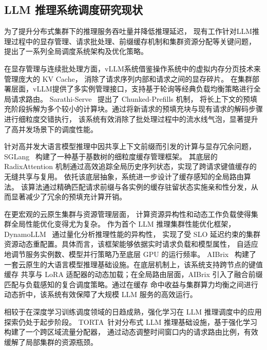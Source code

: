 \subsection{LLM 推理系统调度研究现状}\label{subsec:llm-routing}

为了提升分布式集群下的推理服务吞吐量并降低推理延迟，
现有工作针对LLM推理过程中的显存管理、请求批处理、前缀缓存机制和集群资源分配等关键问题，
提出了一系列全局调度系统架构及优化策略。

在显存管理与连续批处理方面，vLLM系统借鉴操作系统中的虚拟内存分页技术来管理庞大的 KV Cache，
消除了请求序列内部和请求之间的显存碎片。
在集群部署层面，vLLM提供了多实例管理接口，支持基于轮询等经典负载均衡策略进行全局请求路由。
Sarathi-Serve~\cite{agrawal2024taming} 提出了 Chunked-Prefills 机制，
将长上下文的预填充阶段拆解为多个较小的计算块。通过将新请求的预填充块与现有请求的解码步骤进行细粒度交错执行，
该系统有效消除了批处理过程中的流水线气泡，显著提升了高并发场景下的调度性能。

针对高并发大语言模型推理中因共享上下文前缀而引发的计算与显存冗余问题，
SGLang~\cite{zheng2024sglang} 构建了一种基于基数树的细粒度缓存管理框架。
其底层的 RadixAttention 机制通过高效追踪全局历史序列状态，实现了跨请求键值缓存的无缝共享与复用。
依托该底层抽象，系统进一步设计了缓存感知的全局路由算法。
该算法通过精确匹配请求前缀与各实例的缓存驻留状态实施亲和性分发，从而显著减少了冗余的预填充计算开销。

在更宏观的云原生集群与资源管理层面，
计算资源异构性和动态工作负载使得集群全局性能优化变得尤为复杂。
作为首个 LLM 推理集群性能优化框架，DynamoLLM~\cite{stojkovic2025dynamollm} 通过量化分析推理性能的异构性，
实现了受 SLO 延迟约束的集群资源动态重配置。具体而言，该框架能够依据实时请求负载和模型属性，
自适应地调节服务实例数、模型并行策略乃至底层 GPU 的运行频率。
AIBrix~\cite{team2025aibrix} 构建了一套云原生的大语言模型推理基础设施。在底层机制上，该系统支持跨节点的键值缓存
共享与 LoRA 适配器的动态加载；在全局路由层面，AIBrix 引入了融合前缀匹配与负载感知的复合调度策略。通过在缓存
命中收益与集群算力均衡之间进行动态折中，该系统有效保障了大规模 LLM 服务的高效运行。

相较于在深度学习训练调度领域的日趋成熟，强化学习在 LLM 推理调度中的应用探索仍处于起步阶段。
TORTA~\cite{du2025temporal}针对分布式 LLM 推理基础设施，基于强化学习构建了一个跨区域流量分配器，
通过动态调整时间窗口内的请求路由比例，有效缓解了局部集群的资源瓶颈。

